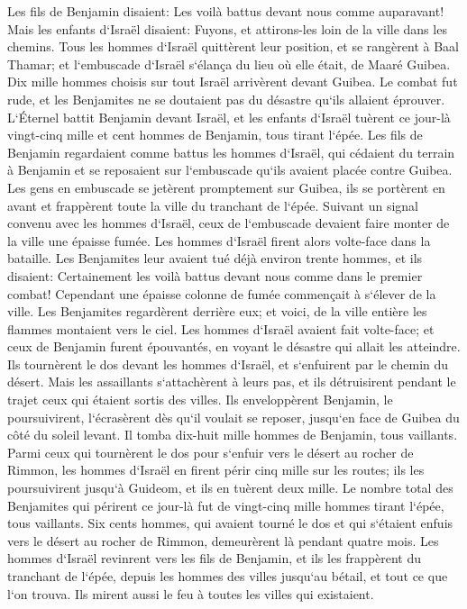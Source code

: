 \verse Les fils de Benjamin disaient: Les voilà battus devant nous comme auparavant! Mais les enfants d`Israël disaient: Fuyons, et attirons-les loin de la ville dans les chemins. 
\verse Tous les hommes d`Israël quittèrent leur position, et se rangèrent à Baal Thamar; et l`embuscade d`Israël s`élança du lieu où elle était, de Maaré Guibea. 
\verse Dix mille hommes choisis sur tout Israël arrivèrent devant Guibea. Le combat fut rude, et les Benjamites ne se doutaient pas du désastre qu`ils allaient éprouver. 
\verse L`Éternel battit Benjamin devant Israël, et les enfants d`Israël tuèrent ce jour-là vingt-cinq mille et cent hommes de Benjamin, tous tirant l`épée. 
\verse Les fils de Benjamin regardaient comme battus les hommes d`Israël, qui cédaient du terrain à Benjamin et se reposaient sur l`embuscade qu`ils avaient placée contre Guibea. 
\verse Les gens en embuscade se jetèrent promptement sur Guibea, ils se portèrent en avant et frappèrent toute la ville du tranchant de l`épée. 
\verse Suivant un signal convenu avec les hommes d`Israël, ceux de l`embuscade devaient faire monter de la ville une épaisse fumée. 
\verse Les hommes d`Israël firent alors volte-face dans la bataille. Les Benjamites leur avaient tué déjà environ trente hommes, et ils disaient: Certainement les voilà battus devant nous comme dans le premier combat! 
\verse Cependant une épaisse colonne de fumée commençait à s`élever de la ville. Les Benjamites regardèrent derrière eux; et voici, de la ville entière les flammes montaient vers le ciel. 
\verse Les hommes d`Israël avaient fait volte-face; et ceux de Benjamin furent épouvantés, en voyant le désastre qui allait les atteindre. 
\verse Ils tournèrent le dos devant les hommes d`Israël, et s`enfuirent par le chemin du désert. Mais les assaillants s`attachèrent à leurs pas, et ils détruisirent pendant le trajet ceux qui étaient sortis des villes. 
\verse Ils enveloppèrent Benjamin, le poursuivirent, l`écrasèrent dès qu`il voulait se reposer, jusqu`en face de Guibea du côté du soleil levant. 
\verse Il tomba dix-huit mille hommes de Benjamin, tous vaillants. 
\verse Parmi ceux qui tournèrent le dos pour s`enfuir vers le désert au rocher de Rimmon, les hommes d`Israël en firent périr cinq mille sur les routes; ils les poursuivirent jusqu`à Guideom, et ils en tuèrent deux mille. 
\verse Le nombre total des Benjamites qui périrent ce jour-là fut de vingt-cinq mille hommes tirant l`épée, tous vaillants. 
\verse Six cents hommes, qui avaient tourné le dos et qui s`étaient enfuis vers le désert au rocher de Rimmon, demeurèrent là pendant quatre mois. 
\verse Les hommes d`Israël revinrent vers les fils de Benjamin, et ils les frappèrent du tranchant de l`épée, depuis les hommes des villes jusqu`au bétail, et tout ce que l`on trouva. Ils mirent aussi le feu à toutes les villes qui existaient. 

